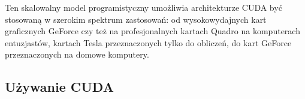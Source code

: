 Ten skalowalny model programistyczny umożliwia architekturze CUDA być stosowaną w szerokim spektrum zastosowań: od wysokowydajnych kart graficznych GeForce czy też na profesjonalnych kartach Quadro na komputerach entuzjastów, kartach Tesla przeznaczonych tylko do obliczeń, do kart GeForce przeznaczonych na domowe komputery.

\subsection{Używanie CUDA}